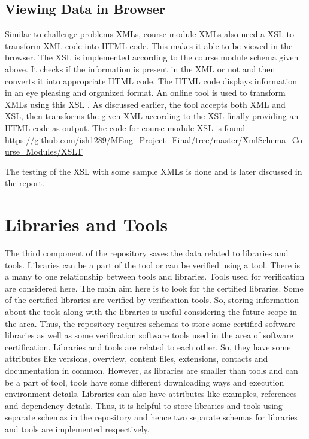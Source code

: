 \documentclass[11pt,letterpaper]{report}
\begin{document}
 

\section*{Viewing Data in Browser}
Similar to challenge problems XMLs, course module XMLs also need a XSL to transform XML code into HTML code. This makes it able to be viewed in the browser. The XSL is implemented according to the course module schema given above. It checks if the information is present in the XML or not and then converts it into appropriate HTML code. The HTML code displays information in an eye pleasing and organized format. An online tool is used to transform XMLs using this XSL \cite{olXSL}. As discussed earlier, the tool accepts both XML and XSL, then transforms the given XML according to the XSL finally providing an HTML code as output. The code for course module XSL is found \url{https://github.com/ish1289/MEng_Project_Final/tree/master/XmlSchema_Course_Modules/XSLT}

\bigskip

The testing of the XSL with some sample XMLs is done and is later discussed in the report. 

\chapter{Libraries and Tools}
The third component of the repository saves the data related to libraries and tools. Libraries can be a part of the tool or can be verified using a tool. There is a many to one relationship between tools and libraries. Tools used for verification are considered here. The main aim here is to look for the certified libraries. Some of the certified libraries are verified by verification tools. So, storing information about the tools along with the libraries is useful considering the future scope in the area. Thus, the repository requires schemas to store some certified software libraries as well as some verification software tools used in the area of software certification. Libraries and tools are related to each other. So, they have some attributes like versions, overview, content files, extensions, contacts and documentation in common. However, as libraries are smaller than tools and can be a part of tool, tools have some different downloading ways and execution environment details. Libraries can also have attributes like examples, references and dependency details. Thus, it is helpful to store libraries and tools using separate schemas in the repository and hence two separate schemas for libraries and tools are implemented respectively.   
\end{document}
